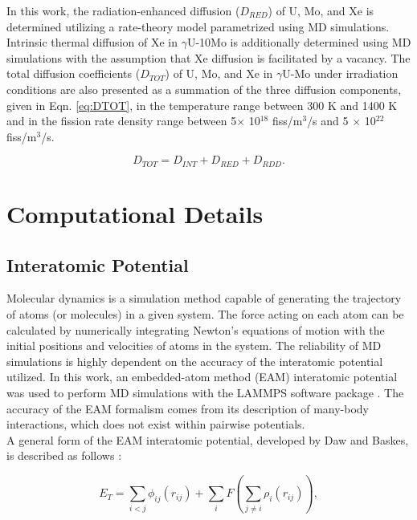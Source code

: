 \documentclass[preprint,12pt]{elsarticle}
\begin{document}
In this work, the radiation-enhanced diffusion ($D_{RED}$) of U, Mo, and Xe is determined utilizing a rate-theory model parametrized using MD simulations. Intrinsic thermal diffusion of Xe in $\gamma$U-10Mo is additionally determined using MD simulations with the assumption that Xe diffusion is facilitated by a vacancy. The total diffusion coefficients ($D_{TOT}$) of U, Mo, and Xe in $\gamma$U-Mo under irradiation conditions are also presented as a summation of the three diffusion components, given in Eqn. \ref{eq:DTOT}, in the temperature range between 300 K and 1400 K and in the fission rate density range between 5$\times$ 10$^{18}$ fiss/m$^{3}$/s and 5 $\times$ 10$^{22}$ fiss/m$^{3}$/s.

\begin{equation}\label{eq:DTOT}
D_{TOT} = D_{INT} + D_{RED} + D_{RDD}.
\end{equation}

\section{Computational Details}
\subsection{Interatomic Potential}
Molecular dynamics is a simulation method capable of generating the trajectory of atoms (or molecules) in a given system. The force acting on each atom can be calculated by numerically integrating Newton's equations of motion with the initial positions and velocities of atoms in the system. The reliability of MD simulations is highly dependent on the accuracy of the interatomic potential utilized. In this work, an embedded-atom method (EAM) interatomic potential was used to perform MD simulations with the LAMMPS software package \cite{plimpton1995fast}. The accuracy of the EAM formalism comes from its description of many-body interactions, which does not exist within pairwise potentials. \\
\indent A general form of the EAM interatomic potential, developed by Daw and Baskes, is described as follows \cite{daw1983semiempirical, daw1984embedded}:

\begin{equation}
\label{eq:eam}
E_{T} = \sum_{i<j}\phi_{ij}({r_{ij}}) + \sum_{i}F(\sum_{j\neq i}\rho_{i}(r_{ij})), 
\end{equation}
\end{document}
